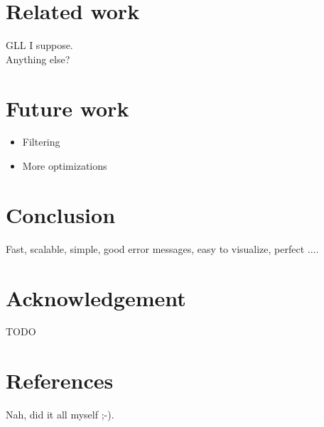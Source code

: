 \documentclass[a4paper,10pt]{article}
\begin{document}
\section{Related work}

GLL I suppose.\\
Anything else?

\section{Future work}

\begin{itemize}
 \setlength{\itemsep}{0pt}
 \setlength{\parskip}{0pt}
 \setlength{\parsep}{0pt}
 
 \item Filtering
 \item More optimizations
\end{itemize}

\section{Conclusion}

Fast, scalable, simple, good error messages, easy to visualize, perfect ....

\section{Acknowledgement}

TODO

\section{References}

Nah, did it all myself ;-).
\end{document}
